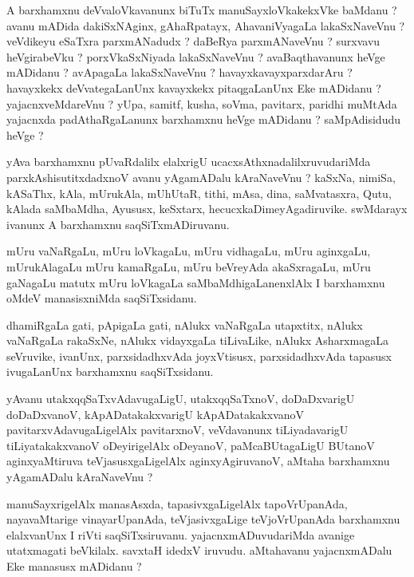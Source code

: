 \documentclass{article}
\begin{document}
\begin{mn}
A barxhamxnu deVvaloVkavanunx biTuTx manuSayxloVkakekxVke baMdanu ?  avanu mADida dakiSxNAginx, 
gAhaRpatayx,  AhavaniVyagaLa  lakaSxNaveVnu ?  veVdikeyu eSaTxra parxmANadudx ?  daBeRya 
parxmANaveVnu ?  surxvavu heVgirabeVku ?  porxVkaSxNiyada  lakaSxNaveVnu ? avaBaqthavanunx 
heVge mADidanu ?  avApagaLa  lakaSxNaveVnu ?   havayxkavayxparxdarAru ?  havayxkekx deVvategaLanUnx kavayxkekx pitaqgaLanUnx 
Eke mADidanu ?  yajacnxveMdareVnu ?  yUpa, samitf, kusha, soVma, pavitarx, paridhi muMtAda 
yajacnxda  padAthaRgaLanunx  barxhamxnu  heVge mADidanu ?  saMpAdisidudu  heVge ? 
\end{mn}

\begin{mn}
yAva barxhamxnu  pUvaRdalilx elalxrigU ucacxsAthxnadalilxruvudariMda parxkAshisutitxdadxnoV 
avanu  yAgamADalu kAraNaveVnu ?  kaSxNa,  nimiSa,  kASaThx, kAla,  mUrukAla,  mUhUtaR,  tithi,  mAsa,  
dina,  saMvatasxra,  Qutu,  kAlada  saMbaMdha,  Ayususx,  keSxtarx,  hecucxkaDimeyAgadiruvike.  
swMdarayx ivanunx A barxhamxnu saqSiTxmADiruvanu. 
\end{mn}

\begin{mn}
mUru vaNaRgaLu, mUru loVkagaLu,  mUru vidhagaLu, mUru aginxgaLu, mUrukAlagaLu  mUru kamaRgaLu, 
mUru beVreyAda akaSxragaLu,  mUru gaNagaLu matutx mUru loVkagaLa saMbaMdhigaLanenxlAlx 
I barxhamxnu oMdeV manasisxniMda saqSiTxsidanu.
\end{mn}

\begin{mn}
dhamiRgaLa gati, pApigaLa gati, nAlukx vaNaRgaLa utapxtitx, nAlukx  vaNaRgaLa 
rakaSxNe, nAlukx vidayxgaLa tiLivaLike, nAlukx AsharxmagaLa seVruvike, ivanUnx, 
parxsidadhxvAda joyxVtisusx, parxsidadhxvAda tapasusx ivugaLanUnx barxhamxnu saqSiTxsidanu.
\end{mn}

\begin{mn}
yAvanu utakxqqSaTxvAdavugaLigU, utakxqqSaTxnoV, doDaDxvarigU  doDaDxvanoV, kApADatakakxvarigU  
kApADatakakxvanoV pavitarxvAdavugaLigelAlx pavitarxnoV, veVdavanunx  tiLiyadavarigU  tiLiyatakakxvanoV  
oDeyirigelAlx  oDeyanoV,  paMcaBUtagaLigU  BUtanoV aginxyaMtiruva  teVjasusxgaLigelAlx  
aginxyAgiruvanoV,  aMtaha barxhamxnu  yAgamADalu  kAraNaveVnu ? 
\end{mn}

\begin{mn}
manuSayxrigelAlx manasAsxda,  tapasivxgaLigelAlx  tapoVrUpanAda,  nayavaMtarige  
vinayarUpanAda,  teVjasivxgaLige  teVjoVrUpanAda  barxhamxnu  elalxvanUnx  I riVti 
saqSiTxsiruvanu.  yajacnxmADuvudariMda  avanige utatxmagati beVkilalx.   savxtaH  
idedxV  iruvudu.  aMtahavanu  yajacnxmADalu  Eke manasusx mADidanu ?
\end{mn}
\end{document}
